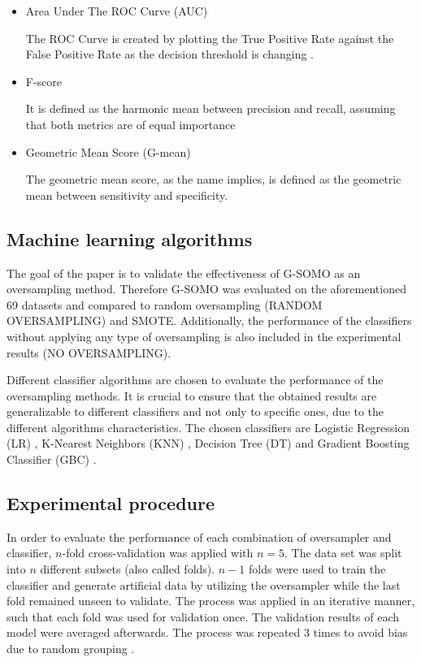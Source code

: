 \documentclass[parskip=full]{scrartcl}
\begin{document}
\begin{itemize}

	\renewcommand\labelitemi{--}

	\item Area Under The ROC Curve (AUC)
  
  	The ROC Curve is created by plotting the True Positive Rate against the
  	False Positive Rate as the decision threshold is changing \cite{Hand2009}.
	
	\item F-score
	  
	It is defined as the harmonic mean between precision and recall,
	assuming that both metrics are of equal importance \cite{Guo2018}
    
  	\item Geometric Mean Score (G-mean)
  
  	The geometric mean score, as the name implies, is defined as the geometric
  	mean between sensitivity and specificity.

\end{itemize}

\subsection{Machine learning algorithms} 

The goal of the paper is to validate the effectiveness of G-SOMO as an
oversampling method. Therefore G-SOMO was evaluated on the
aforementioned 69 datasets and compared to random
oversampling (RANDOM OVERSAMPLING) and SMOTE. Additionally, the performance of
the classifiers without applying any type of oversampling is also included in
the experimental results (NO OVERSAMPLING).

Different classifier algorithms are chosen to evaluate the performance of the
oversampling methods. It is crucial to ensure that the obtained results are
generalizable to different classifiers and not only to specific ones, due to the
different algorithms characteristics. The chosen classifiers are Logistic
Regression (LR) \cite{McCullagh1989}, K-Nearest Neighbors (KNN)
\cite{Cover1967}, Decision Tree (DT) \cite{Salzberg1994} and Gradient Boosting
Classifier (GBC) \cite{Friedman2001}.

\subsection{Experimental procedure}

In order to evaluate the performance of each combination of oversampler and
classifier, $n$-fold cross-validation was applied with $n = 5$. The data set was
split into $n$ different subsets (also called folds). $n-1$ folds were used to
train the classifier and generate artificial data by utilizing the oversampler
while the last fold remained unseen to validate. The process was applied in an
iterative manner, such that each fold was used for validation once. The
validation results of each model were averaged afterwards. The process was
repeated 3 times to avoid bias due to random grouping \cite{Japkowicz2013}.
\end{document}
